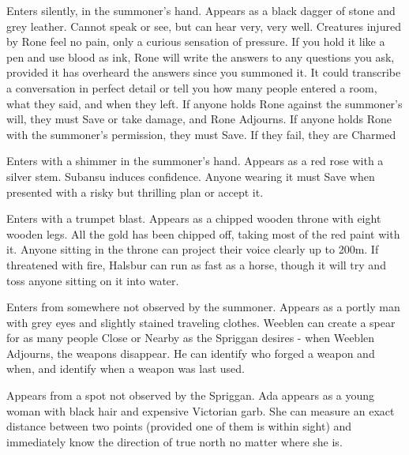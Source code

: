 {
Enters silently, in the summoner's hand. Appears as a black dagger of stone and grey leather. Cannot speak or see, but can hear very, very well. Creatures injured by Rone feel no pain, only a curious sensation of pressure. If you hold it like a pen and use blood as ink, Rone will write the answers to any questions you ask, provided it has overheard the answers since you summoned it. It could transcribe a conversation in perfect detail or tell you how many people entered a room, what they said, and when they left. If anyone holds Rone against the summoner's will, they must Save or take \SUMDICE damage, and Rone Adjourns. If anyone holds Rone with the summoner's permission, they must Save. If they fail, they are Charmed

Enters with a shimmer in the summoner's hand. Appears as a red rose with a silver stem. Subansu induces confidence. Anyone wearing it must Save when presented with a risky but thrilling plan or accept it. 


Enters with a trumpet blast. Appears as a chipped wooden throne with eight wooden legs. All the gold has been chipped off, taking most of the red paint with it. Anyone sitting in the throne can project their voice clearly up to 200m.  If threatened with fire, Halsbur can run as fast as a horse, though it will try and toss anyone sitting on it into water.


Enters from somewhere not observed by the summoner. Appears as a portly man with grey eyes and slightly stained traveling clothes. Weeblen can create a spear for as many people Close or Nearby as the Spriggan desires - when Weeblen Adjourns, the weapons disappear.   He can identify who forged a weapon and when, and identify when a weapon was last used. 


Appears from a spot not observed by the Spriggan.  Ada appears as a young woman with black hair and expensive Victorian garb.  She can measure an exact distance between two points (provided one of them is within sight) and immediately know the direction of true north no matter where she is. 



}
